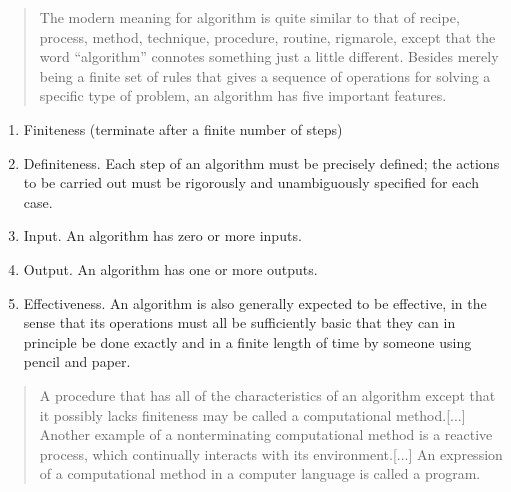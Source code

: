 \documentclass[10pt, aspectratio=169]{beamer}
\begin{document}
\begin{frame}[fragile]
\cite{knuth-taocp1-97}

\vspace{0.5cm}

\begin{quote}
The modern meaning for algorithm is quite similar to
that of recipe, process, method, technique, procedure, routine, rigmarole, 
except that the word “algorithm” connotes something just a little different.
Besides merely being a finite set of rules that gives a sequence of operations 
for solving a specific type of problem, an algorithm has five important 
features.
\end{quote}

\end{frame}

\begin{frame}[fragile]
\cite{knuth-taocp1-97}
\begin{enumerate}
  \item Finiteness (terminate after a finite number of steps)
  \item Definiteness. Each step of an algorithm must be precisely defined; 
    the actions to be carried out must be rigorously and unambiguously 
    specified for each case.
  \item Input. An algorithm has zero or more inputs.
  \item Output. An algorithm has one or more outputs.  
  \item Effectiveness. An algorithm is also generally expected to be effective, 
    in the sense that its operations must all be sufficiently basic that they 
    can in principle be done exactly and in a finite length of time by someone 
    using pencil and paper.
\end{enumerate}
\end{frame}

\begin{frame}[fragile]
\cite{knuth-taocp1-97}

\vspace{0.5cm}

\begin{quote}
A procedure that has all of the characteristics of an algorithm except that it
possibly lacks finiteness may be called a computational method.[...]
Another example of a nonterminating computational method is a reactive process, 
which continually interacts with its environment.[...]
An expression of a computational method in a computer language is called 
a program.
\end{quote}

\end{frame}
\end{document}
